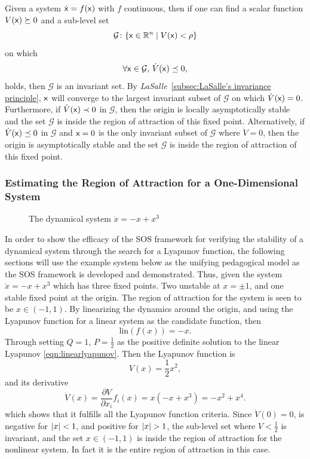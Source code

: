 \begin{theorem}
  Given a system \(\dot{{\mathbf{\mathsf{x}}}} = f({\mathbf{\mathsf{x}}})\) with \(f\) continuous, then if
  one can find a scalar function \(V({\mathbf{\mathsf{x}}}) \succeq 0 \) and a sub-level set
  \[
    \mathcal{G} \colon \lbrace{\mathbf{\mathsf{x}}} \in \mathbb{R}^n \mid V({\mathbf{\mathsf{x}}}) < \rho\rbrace
  \]
  on which
  \[
    \forall {\mathbf{\mathsf{x}}} \in \mathcal{G},\,\dot{V}({\mathbf{\mathsf{x}}}) \preceq 0,
  \]
  holds, then \(\mathcal{G}\) is an invariant set. By
  \textit{LaSalle}~\ref{subsec:LaSalle's invariance principle}, \({\mathbf{\mathsf{x}}}\)
  will converge to the largest invariant subset of \(\mathcal{G}\) on which
  \(\dot{V}({\mathbf{\mathsf{x}}}) = 0\). Furthermore, if \(\dot{V}({\mathbf{\mathsf{x}}}) \prec 0\) in
  \(\mathcal{G}\), then the origin is locally asymptotically stable and the set
  \(\mathcal{G}\) is inside the region of attraction of this fixed point.
  Alternatively, if \(\dot{V}({\mathbf{\mathsf{x}}}) \preceq 0 \) in \(\mathcal{G}\) and
  \({\mathbf{\mathsf{x}}} = 0\) is the only invariant subset of \(\mathcal{G}\) where
  \(\dot{V} = 0\), then the origin is asymptotically stable and the set
  \(\mathcal{G}\) is inside the region of attraction of this fixed point.
\end{theorem}

\subsubsection{Estimating the Region of Attraction for a One-Dimensional System}
\label{subsec:Estimating the region of attraction for a one-dimensional system}

\begin{figure}
  \centering 
  \caption{The dynamical system \(\dot{x} = -x + x^3\)}
\end{figure}

In order to show the efficacy of the \ac{SOS} framework for verifying the
stability of a dynamical system through the search for a Lyapunov function, the
following sections will use the example system below as the unifying pedagogical
model as the \ac{SOS} framework is developed and demonstrated. Thus, given the
system \(\dot{x} = -x + x^3\) which has three fixed points. Two unstable at \(x
= \pm 1\), and one stable fixed point at the origin. The region of attraction
for the system is seen to be \(x \in \left( -1, 1 \right)\). By linearizing the
dynamics around the origin, and using the Lyapunov function for a linear system
as the candidate function, then
\[
  \text{lin}(f(x)) = -x.
\]
Through setting \(Q=1\), \(P=\frac{1}{2}\) as the positive definite solution to
the linear Lyapunov \cref{eqn:linearlyapunov}. Then the Lyapunov function is
\[
  V(x) = \frac{1}{2}x^2,
\]
and its derivative
\[
  \dot{V}(x) = \frac{\partial V}{\partial x_i} f_i(x) = x(-x + x^3) = -x^2 +
  x^4.
\]
which shows that it fulfills all the Lyapunov function criteria. Since
\(\dot{V}(0) = 0\), is negative for \(\lvert x\rvert<1\), and positive for \(\lvert x\rvert >
1\), the sub-level set where \(V < \frac{1}{2}\) is invariant, and the set \(x
\in \left( -1, 1 \right)\) is inside the region of attraction for the nonlinear
system. In fact it is the entire region of attraction in this case.

